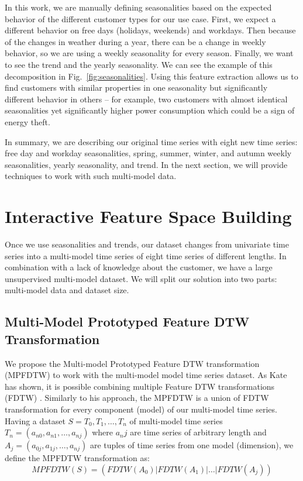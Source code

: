 In this work, we are manually defining seasonalities based on the expected behavior of the different customer types for our use case. First, we expect a different behavior on free days (holidays, weekends) and workdays. Then because of the changes in weather during a year, there can be a change in weekly behavior, so we are using a weekly seasonality for every season. Finally, we want to see the trend and the yearly seasonality. We can see the example of this decomposition in Fig.~\ref{fig:seasonalities}. Using this feature extraction allows us to find customers with similar properties in one seasonality but significantly different behavior in others -- for example, two customers with almost identical seasonalities yet significantly higher power consumption which could be a sign of energy theft.

In summary, we are describing our original time series with eight new time series: free day and workday seasonalities, spring, summer, winter, and autumn weekly seasonalities, yearly seasonality, and trend. In the next section, we will provide techniques to work with such multi-model data.

\section{Interactive Feature Space Building}
Once we use seasonalities and trends, our dataset changes from univariate time series into a multi-model time series of eight time series of different lengths. In combination with a lack of knowledge about the customer, we have a large unsupervised multi-model dataset. We will split our solution into two parts: multi-model data and dataset size.

\subsection{Multi-Model Prototyped Feature DTW Transformation}
We propose the Multi-model Prototyped Feature DTW transformation (MPFDTW) to work with the multi-model model time series dataset. As Kate has shown, it is possible combining multiple Feature DTW transformations (FDTW) \cite{met:fDTW}. Similarly to his approach, the MPFDTW is a union of FDTW transformation for every component (model) of our multi-model time series. Having a dataset $S = {T_0, T_1, \dots, T_n}$ of multi-model time series $T_n = (a_{n0}, a_{n1}, \dots, a_{nj})$ where $a_nj$ are time series of arbitrary length and $A_j = (a_{0j}, a_{1j}, \dots, a_{nj})$ are tuples of time series from one model (dimension), we define the MPFDTW transformation as:
\begin{equation}
 MPFDTW(S) = ( FDTW(A_{0}) | FDTW(A_{1}) | \dots | FDTW(A_{j}) )
\end{equation}

